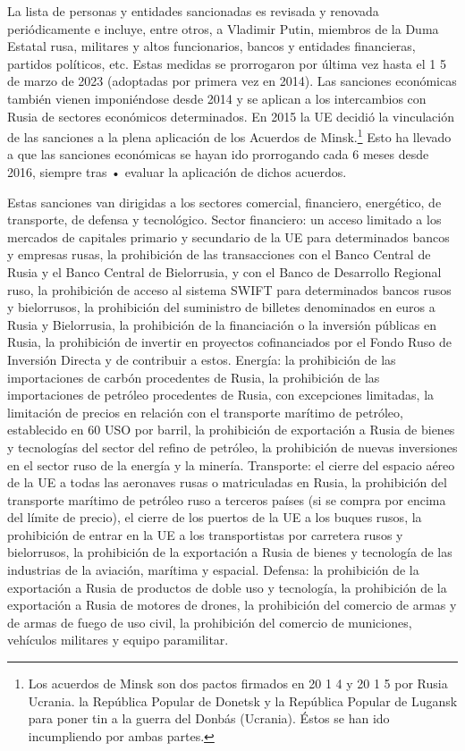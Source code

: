 \documentclass[10pt,a4paper]{article}
\begin{document}
La lista de personas y entidades sancionadas es revisada y renovada periódicamente e incluye, entre otros, a Vladimir Putin, miembros de la Duma Estatal rusa, militares y altos funcionarios, bancos y entidades financieras, partidos políticos, etc. Estas medidas se prorrogaron por última vez hasta el 1 5 de marzo de 2023 (adoptadas por primera vez en 2014). Las sanciones económicas también vienen imponiéndose desde 2014 y se aplican a los intercambios con Rusia de sectores económicos determinados. En 2015 la UE decidió la vinculación de las sanciones a la plena aplicación de los Acuerdos de Minsk.\footnote{%
    Los acuerdos de Minsk son dos pactos firmados en 20 1 4 y 20 1 5 por Rusia Ucrania. la República Popular de Donetsk y la República Popular de Lugansk para poner tin a la guerra del Donbás (Ucrania). Éstos se han ido incumpliendo por ambas partes.
} Esto ha llevado a que las sanciones económicas se hayan ido prorrogando cada 6 meses desde 2016, siempre tras • evaluar la aplicación de dichos acuerdos.

Estas sanciones van dirigidas a los sectores comercial, financiero, energético, de transporte, de defensa y tecnológico.
Sector financiero: un acceso limitado a los mercados de capitales primario y secundario de la UE para determinados bancos y empresas rusas, la prohibición de las transacciones con el Banco Central de Rusia y el Banco Central de Bielorrusia, y con el Banco de Desarrollo Regional ruso, la prohibición de acceso al sistema SWIFT para determinados bancos rusos y bielorrusos, la prohibición del suministro de billetes denominados en euros a Rusia y Bielorrusia, la prohibición de la financiación o la inversión públicas en Rusia, la prohibición de invertir en proyectos cofinanciados por el Fondo Ruso de Inversión Directa y de contribuir a estos.
Energía: la prohibición de las importaciones de carbón procedentes de Rusia, la prohibición de las importaciones de petróleo procedentes de Rusia, con excepciones limitadas, la limitación de precios en relación con el transporte marítimo de petróleo, establecido en 60 USO por barril, la prohibición de exportación a Rusia de bienes y tecnologías del sector del refino de petróleo, la prohibición de nuevas inversiones en el sector ruso de la energía y la minería.
Transporte: el cierre del espacio aéreo de la UE a todas las aeronaves rusas o matriculadas en Rusia, la prohibición del transporte marítimo de petróleo ruso a terceros países (si se compra por encima del límite de precio), el cierre de los puertos de la UE a los buques rusos, la prohibición de entrar en la UE a los transportistas por carretera rusos y bielorrusos, la prohibición de la exportación a Rusia de bienes y tecnología de las industrias de la aviación, marítima y espacial.
Defensa: la prohibición de la exportación a Rusia de productos de doble uso y tecnología, la prohibición de la exportación a Rusia de motores de drones, la prohibición del comercio de armas y de armas de fuego de uso civil, la prohibición del comercio de municiones, vehículos militares y equipo paramilitar.
\end{document}
